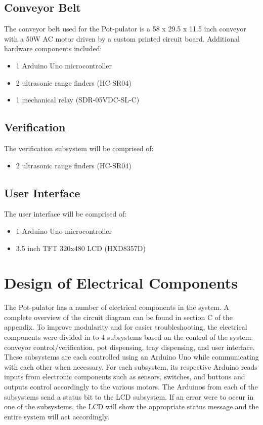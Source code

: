 \documentclass[12pt, titlepage]{article}
\begin{document}
\subsection{Conveyor Belt}

The conveyor belt used for the Pot-pulator is a 58 x 29.5 x 11.5 inch conveyor with a 50W AC motor driven by a custom printed
circuit board. Additional hardware components included:
\begin{itemize}
  \item 1 Arduino Uno microcontroller
  \item 2 ultrasonic range finders (HC-SR04)
  \item 1 mechanical relay (SDR-05VDC-SL-C)
\end{itemize}

\subsection{Verification}

The verification subsystem will be comprised of:
\begin{itemize}
  \item 2 ultrasonic range finders (HC-SR04)
\end{itemize}

\subsection{User Interface}

The user interface will be comprised of:
\begin{itemize}
  \item 1 Arduino Uno microcontroller
  \item 3.5 inch TFT 320x480 LCD (HXD8357D)
\end{itemize}

\section{Design of Electrical Components}

The Pot-pulator has a number of electrical components in the system. A complete overview of the circuit diagram
can be found in section C of the appendix. To improve modularity and for easier troubleshooting,
the electrical components were divided in to 4 subsystems based on the control of the system: conveyor control/verification, pot
dispensing, tray dispensing, and user interface. These subsystems are each controlled using an 
Arduino Uno while communicating with each other when necessary. For each subsystem,
its respective Arduino reads inputs from electronic components such as sensors, switches, and buttons and 
outputs control accordingly to the various motors. The Arduinos from each of the 
subsystems send a status bit to the LCD subsystem. If an error were to occur in
one of the subsystems, the LCD will show the appropriate status message and the entire system will act accordingly.
\end{document}
